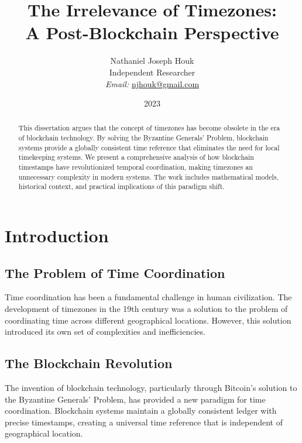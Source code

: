 \documentclass[12pt]{report}
\begin{document}
\title{The Irrelevance of Timezones: \\ A Post-Blockchain Perspective}

\author{Nathaniel Joseph Houk\\
Independent Researcher\\
\textit{Email:} \href{mailto:njhouk@gmail.com}{njhouk@gmail.com}}
\date{2023}

\maketitle

\begin{abstract}
This dissertation argues that the concept of timezones has become obsolete in the era of blockchain technology. By solving the Byzantine Generals' Problem, blockchain systems provide a globally consistent time reference that eliminates the need for local timekeeping systems. We present a comprehensive analysis of how blockchain timestamps have revolutionized temporal coordination, making timezones an unnecessary complexity in modern systems. The work includes mathematical models, historical context, and practical implications of this paradigm shift.
\end{abstract}

\chapter{Introduction}

\section{The Problem of Time Coordination}
Time coordination has been a fundamental challenge in human civilization. The development of timezones in the 19th century was a solution to the problem of coordinating time across different geographical locations. However, this solution introduced its own set of complexities and inefficiencies.

\section{The Blockchain Revolution}
The invention of blockchain technology, particularly through Bitcoin's solution to the Byzantine Generals' Problem, has provided a new paradigm for time coordination. Blockchain systems maintain a globally consistent ledger with precise timestamps, creating a universal time reference that is independent of geographical location.
\end{document}
